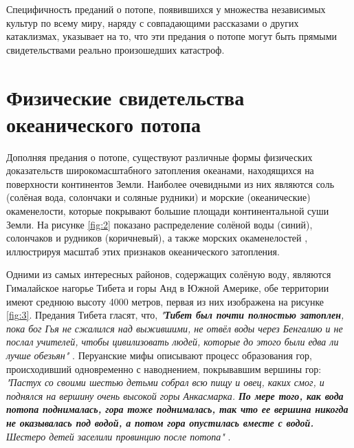 \documentclass[10pt,twocolumn,letterpaper]{article}
\begin{document}
Специфичность преданий о потопе, появившихся у множества независимых культур по всему миру, наряду с совпадающими рассказами о других катаклизмах, указывает на то, что эти предания о потопе могут быть прямыми свидетельствами реально произошедших катастроф.

\section{Физические свидетельства океанического потопа}

Дополняя предания о потопе, существуют различные формы физических доказательств широкомасштабного затопления океанами, находящихся на поверхности континентов Земли. Наиболее очевидными из них являются соль (солёная вода, солончаки и соляные рудники) и морские (океанические) окаменелости, которые покрывают большие площади континентальной суши Земли. На рисунке \ref{fig:2} показано распределение солёной воды (синий), солончаков и рудников (коричневый), а также морских окаменелостей \cite{15,16,86,87}, иллюстрируя масштаб этих признаков океанического затопления.

Одними из самых интересных районов, содержащих солёную воду, являются Гималайское нагорье Тибета и горы Анд в Южной Америке, обе территории имеют среднюю высоту 4000 метров, первая из них изображена на рисунке \ref{fig:3}. Предания Тибета гласят, что, \textit{"\textbf{Тибет был почти полностью затоплен}, пока бог Гья не сжалился над выжившими, не отвёл воды через Бенгалию и не послал учителей, чтобы цивилизовать людей, которые до этого были едва ли лучше обезьян"} \cite{3}. Перуанские мифы описывают процесс образования гор, происходивший одновременно с наводнением, покрывавшим вершины гор: \textit{"Пастух со своими шестью детьми собрал всю пищу и овец, каких смог, и поднялся на вершину очень высокой горы Анкасмарка. \textbf{По мере того, как вода потопа поднималась, гора тоже поднималась, так что ее вершина никогда не оказывалась под водой, а потом гора опустилась вместе с водой.} Шестеро детей заселили провинцию после потопа"} \cite{3}.
\end{document}
